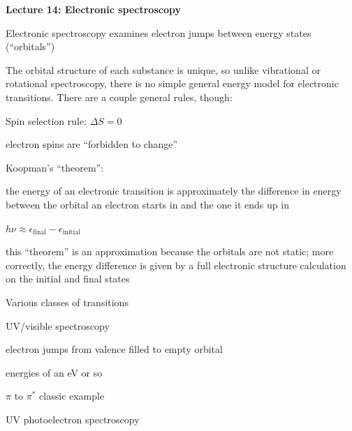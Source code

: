 \documentclass[11pt]{article}
\begin{document}
\begin{outline}
\item {\bf Lecture 14: Electronic spectroscopy}
  \begin{outline}
  \item Electronic spectroscopy examines electron jumps between energy states (“orbitals”)
  \item The orbital structure of each substance is unique, so unlike vibrational or rotational spectroscopy, there is no simple general energy model for electronic transitions.  There are a couple general rules, though:
    \begin{outline}
      \item Spin selection rule: $\Delta S = 0$
        \begin{outline}
          \item electron spins are ``forbidden to change''
        \end{outline}
      \item Koopman’s ``theorem'':
        \begin{outline}
        \item the energy of an electronic transition is approximately the difference in energy between the orbital an electron starts in and the one it ends up in
          \begin{outline}
          \item $h \nu \approx \epsilon_\mathrm{final}-\epsilon_\mathrm{initial}$
          \end{outline}
        \item this “theorem” is an approximation because the orbitals are not static; more correctly, the energy difference is given by a full electronic structure calculation on the initial and final states
        \end{outline}
      \end{outline}
    \item Various classes of transitions
      \begin{outline}
      \item UV/visible spectroscopy
        \begin{outline}
        \item electron jumps from valence filled to empty orbital
        \item energies of an eV or so
        \item $\pi$ to $\pi^*$ classic example
        \end{outline}
      \item UV photoelectron spectroscopy
        \begin{outline}

\end{outline}
\end{outline}
\end{outline}
\end{outline}
\end{document}
